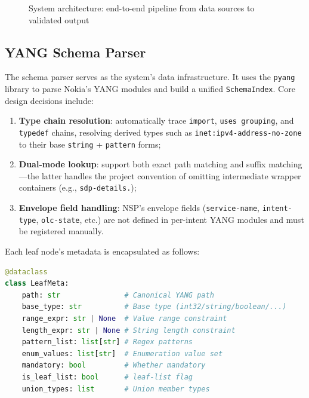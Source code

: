 \documentclass[12pt, a4paper]{article}
\newcommand{\yang}{\textsc{YANG}}
\newcommand{\nsp}{\textsc{NSP}}
\begin{document}
\begin{figure}[H]
\caption{System architecture: end-to-end pipeline from data sources to validated output}
\label{fig:pipeline}
\end{figure}

\subsection{YANG Schema Parser}
\label{sec:yang-parser}

The schema parser serves as the system's data infrastructure. It uses the \texttt{pyang} library to parse Nokia's \yang{} modules and build a unified \texttt{SchemaIndex}. Core design decisions include:

\begin{enumerate}
  \item \textbf{Type chain resolution}: automatically trace \texttt{import}, \texttt{uses grouping}, and \texttt{typedef} chains, resolving derived types such as \texttt{inet:ipv4-address-no-zone} to their base \texttt{string} + \texttt{pattern} forms;
  \item \textbf{Dual-mode lookup}: support both exact path matching and suffix matching---the latter handles the project convention of omitting intermediate wrapper containers (e.g., \texttt{sdp-details.});
  \item \textbf{Envelope field handling}: \nsp{}'s envelope fields (\texttt{service-name}, \texttt{intent-type}, \texttt{olc-state}, etc.) are not defined in per-intent \yang{} modules and must be registered manually.
\end{enumerate}

\noindent
Each leaf node's metadata is encapsulated as follows:

\begin{lstlisting}[language=Python, caption={LeafMeta data structure}]
@dataclass
class LeafMeta:
    path: str               # Canonical YANG path
    base_type: str          # Base type (int32/string/boolean/...)
    range_expr: str | None  # Value range constraint
    length_expr: str | None # String length constraint
    pattern_list: list[str] # Regex patterns
    enum_values: list[str]  # Enumeration value set
    mandatory: bool         # Whether mandatory
    is_leaf_list: bool      # leaf-list flag
    union_types: list       # Union member types
\end{lstlisting}
\end{document}
